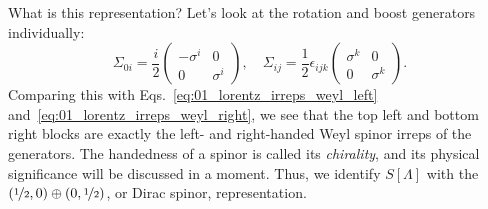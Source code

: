 What is this representation?
Let's look at the rotation and boost generators individually:
\begin{equation}
	\label{eq:01_qft_spinors_spinor_generators}
	\Sigma_{0i} = \frac{i}{2} \begin{pmatrix} -\sigma^i & 0 \\ 0 & \sigma^i \end{pmatrix}, \quad
	\Sigma_{ij} = \frac{1}{2} \epsilon_{ijk} \begin{pmatrix} \sigma^k & 0 \\ 0 & \sigma^k \end{pmatrix}.
\end{equation}
Comparing this with Eqs.~\ref{eq:01_lorentz_irreps_weyl_left} and~\ref{eq:01_lorentz_irreps_weyl_right}, we see that the top left and bottom right blocks are exactly the left- and right-handed Weyl spinor irreps of the generators.
The handedness of a spinor is called its \textit{chirality}, and its physical significance will be discussed in a moment.
Thus, we identify $S[\Lambda]$ with the $(\cnicefrac{1}{2},0) \oplus (0,\cnicefrac{1}{2})$, or Dirac spinor, representation.

